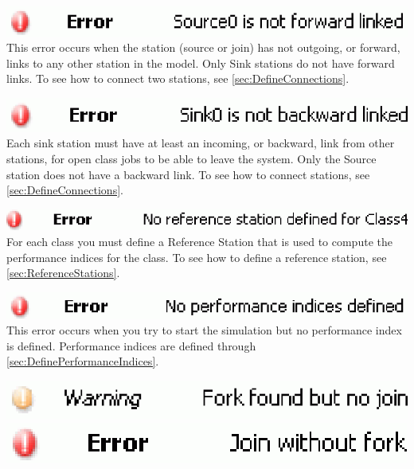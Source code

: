 \begin{itemize*}
\item \includegraphics[scale=.5]{img/jsim/1.eps}\\
This error occurs when the station (source or join) has not outgoing, or forward, links to any other station in the model. Only Sink stations do not have forward links.
To see how to connect two stations, see \autoref{sec:DefineConnections}.
\item \includegraphics[scale=.5]{img/jsim/2.eps}\\
Each sink station must have at least an incoming, or backward, link from other stations, for open class jobs to be able to leave the system. Only the Source station does not have a backward link. To see how to connect stations, see \autoref{sec:DefineConnections}.
\item \includegraphics[scale=.5]{img/jsim/3.eps}\\
 For each class you must define a Reference Station that is used to compute the performance indices for the class. To see how to define a reference  station, see \autoref{sec:ReferenceStations}.
\item \includegraphics[scale=.5]{img/jsim/4.eps}\\
This error occurs when you try to start the simulation but no performance index is defined. Performance indices are defined through \autoref{sec:DefinePerformanceIndices}.
\item \includegraphics[scale=.5]{img/jsim/5.eps}\\
\includegraphics[scale=.5]{img/jsim/9.eps}\\

\end{itemize*}

